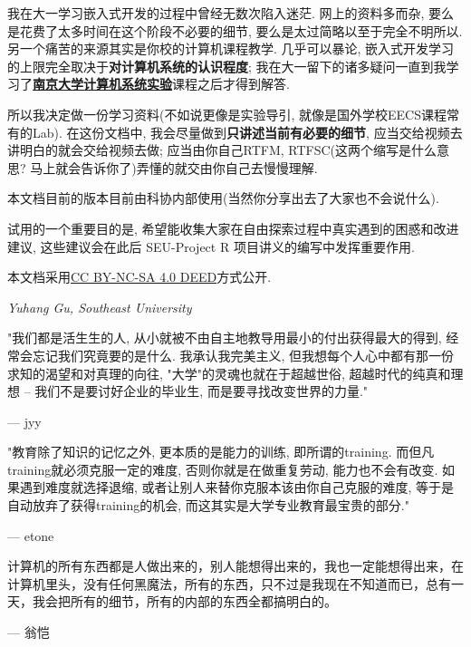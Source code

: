 我在大一学习嵌入式开发的过程中曾经无数次陷入迷茫. 网上的资料多而杂, 要么是花费了太多时间在这个阶段不必要的细节, 要么是太过简略以至于完全不明所以. 另一个痛苦的来源其实是你校的计算机课程教学. 几乎可以暴论, 嵌入式开发学习的上限完全取决于\textbf{对计算机系统的认识程度}; 我在大一留下的诸多疑问一直到我学习了\href{https://nju-projectn.github.io/ics-pa-gitbook/ics2023/index.html}{\textbf{南京大学计算机系统实验}}课程之后才得到解答.

所以我决定做一份学习资料(不如说更像是实验导引, 就像是国外学校EECS课程常有的Lab). 在这份文档中, 我会尽量做到\textbf{只讲述当前有必要的细节}, 应当交给视频去讲明白的就会交给视频去做; 应当由你自己RTFM, RTFSC(这两个缩写是什么意思? 马上就会告诉你了)弄懂的就交由你自己去慢慢理解.

\begin{definition}
	本文档目前的版本目前由科协内部使用(当然你分享出去了大家也不会说什么).

	试用的一个重要目的是, 希望能收集大家在自由探索过程中真实遇到的困惑和改进建议, 这些建议会在此后 SEU-Project R 项目讲义的编写中发挥重要作用.
\end{definition}

\begin{theorem}
	本文档采用\href{https://creativecommons.org/licenses/by-nc-sa/4.0/deed.zh-hans}{CC BY-NC-SA 4.0 DEED}方式公开.

	\textit{Yuhang Gu, Southeast University}

\end{theorem}
\begin{definition}
	"我们都是活生生的人, 从小就被不由自主地教导用最小的付出获得最大的得到, 经常会忘记我们究竟要的是什么. 我承认我完美主义, 但我想每个人心中都有那一份求知的渴望和对真理的向往, "大学"的灵魂也就在于超越世俗, 超越时代的纯真和理想 -- 我们不是要讨好企业的毕业生, 而是要寻找改变世界的力量."

	--- jyy

	"教育除了知识的记忆之外, 更本质的是能力的训练, 即所谓的training. 而但凡training就必须克服一定的难度, 否则你就是在做重复劳动, 能力也不会有改变. 如果遇到难度就选择退缩, 或者让别人来替你克服本该由你自己克服的难度, 等于是自动放弃了获得training的机会, 而这其实是大学专业教育最宝贵的部分."

	--- etone

	计算机的所有东西都是人做出来的，别人能想得出来的，我也一定能想得出来，在计算机里头，没有任何黑魔法，所有的东西，只不过是我现在不知道而已，总有一天，我会把所有的细节，所有的内部的东西全都搞明白的。

	--- 翁恺
\end{definition}

